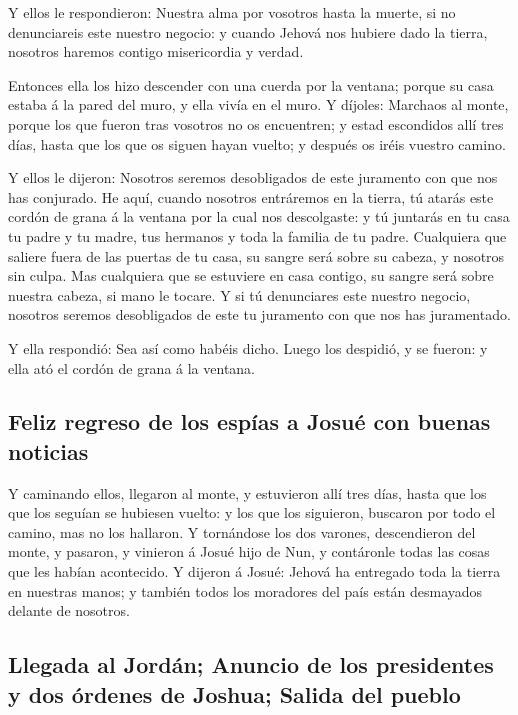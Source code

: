  Y ellos le respondieron: Nuestra alma por vosotros hasta
la muerte, si no denunciareis este nuestro negocio: y cuando Jehová nos
hubiere dado la tierra, nosotros haremos contigo misericordia y verdad.

 Entonces ella los hizo descender con una cuerda por la
ventana; porque su casa estaba á la pared del muro, y ella vivía en el
muro.  Y díjoles: Marchaos al monte, porque los que
fueron tras vosotros no os encuentren; y estad escondidos allí tres
días, hasta que los que os siguen hayan vuelto; y después os iréis
vuestro camino.

 Y ellos le dijeron: Nosotros seremos desobligados de
este juramento con que nos has conjurado.  He aquí,
cuando nosotros entráremos en la tierra, tú atarás este cordón de grana
á la ventana por la cual nos descolgaste: y tú juntarás en tu casa tu
padre y tu madre, tus hermanos y toda la familia de tu padre.
 Cualquiera que saliere fuera de las puertas de tu casa,
su sangre será sobre su cabeza, y nosotros sin culpa. Mas cualquiera que
se estuviere en casa contigo, su sangre será sobre nuestra cabeza, si
mano le tocare.  Y si tú denunciares este nuestro
negocio, nosotros seremos desobligados de este tu juramento con que nos
has juramentado.

 Y ella respondió: Sea así como habéis dicho. Luego los
despidió, y se fueron: y ella ató el cordón de grana á la ventana.

\hypertarget{feliz-regreso-de-los-espuxedas-a-josuuxe9-con-buenas-noticias}{%
\subsection{Feliz regreso de los espías a Josué con buenas
noticias}\label{feliz-regreso-de-los-espuxedas-a-josuuxe9-con-buenas-noticias}}

 Y caminando ellos, llegaron al monte, y estuvieron allí
tres días, hasta que los que los seguían se hubiesen vuelto: y los que
los siguieron, buscaron por todo el camino, mas no los hallaron.
 Y tornándose los dos varones, descendieron del monte, y
pasaron, y vinieron á Josué hijo de Nun, y contáronle todas las cosas
que les habían acontecido.  Y dijeron á Josué: Jehová ha
entregado toda la tierra en nuestras manos; y también todos los
moradores del país están desmayados delante de nosotros.

\hypertarget{llegada-al-jorduxe1n-anuncio-de-los-presidentes-y-dos-uxf3rdenes-de-joshua-salida-del-pueblo}{%
\subsection{Llegada al Jordán; Anuncio de los presidentes y dos órdenes
de Joshua; Salida del
pueblo}\label{llegada-al-jorduxe1n-anuncio-de-los-presidentes-y-dos-uxf3rdenes-de-joshua-salida-del-pueblo}}

